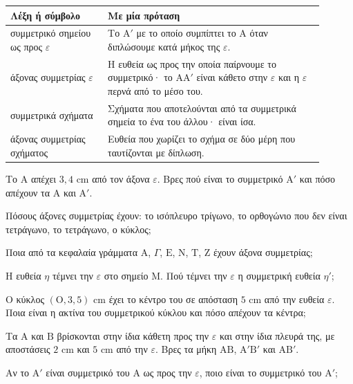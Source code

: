 

\renewcommand{\arraystretch}{1.5}
\begin{longtable}{@{}>{\raggedright\arraybackslash}p{0.28\linewidth} >{\raggedright\arraybackslash}p{0.62\linewidth}@{}}
\toprule
\textbf{Λέξη ή σύμβολο} & \textbf{Με μία πρόταση}\\
\midrule
\endhead
συμμετρικό σημείου ως προς $\varepsilon$ & Το $\mathrm{Α}'$ με το οποίο συμπίπτει το $\mathrm{Α}$ όταν διπλώσουμε κατά μήκος της $\varepsilon$.\\
άξονας συμμετρίας $\varepsilon$ & Η ευθεία ως προς την οποία παίρνουμε το συμμετρικό· το $\mathrm{ΑΑ}'$ είναι κάθετο στην $\varepsilon$ και η $\varepsilon$ περνά από το μέσο του.\\
συμμετρικά σχήματα & Σχήματα που αποτελούνται από τα συμμετρικά σημεία το ένα του άλλου· είναι ίσα.\\
άξονας συμμετρίας σχήματος & Ευθεία που χωρίζει το σχήμα σε δύο μέρη που ταυτίζονται με δίπλωση.\\
\bottomrule
\end{longtable}


\ex Το $\mathrm{Α}$ απέχει $3{,}4$ cm από τον άξονα $\varepsilon$. Βρες πού είναι το συμμετρικό $\mathrm{Α}'$ και πόσο απέχουν τα $\mathrm{Α}$ και $\mathrm{Α}'$.

\ex Πόσους άξονες συμμετρίας έχουν: το ισόπλευρο τρίγωνο, το ορθογώνιο που δεν είναι τετράγωνο, το τετράγωνο, ο κύκλος;

\ex Ποια από τα κεφαλαία γράμματα $\mathrm{Α}$, $\Gamma$, $\mathrm{Ε}$, $\mathrm{Ν}$, $\mathrm{Τ}$, $\mathrm{Ζ}$ έχουν άξονα συμμετρίας;

\ex Η ευθεία $\eta$ τέμνει την $\varepsilon$ στο σημείο $\mathrm{Μ}$. Πού τέμνει την $\varepsilon$ η συμμετρική ευθεία $\eta'$;

\ex Ο κύκλος $(\mathrm{Ο},3{,}5)$ cm έχει το κέντρο του σε απόσταση $5$ cm από την ευθεία $\varepsilon$. Ποια είναι η ακτίνα του συμμετρικού κύκλου και πόσο απέχουν τα κέντρα;

\ex Τα $\mathrm{Α}$ και $\mathrm{Β}$ βρίσκονται στην ίδια κάθετη προς την $\varepsilon$ και στην ίδια πλευρά της, με αποστάσεις $2$ cm και $5$ cm από την $\varepsilon$. Βρες τα μήκη $\mathrm{ΑΒ}$, $\mathrm{Α}'\mathrm{Β}'$ και $\mathrm{ΑΒ}'$.

\ex Αν το $\mathrm{Α}'$ είναι συμμετρικό του $\mathrm{Α}$ ως προς την $\varepsilon$, ποιο είναι το συμμετρικό του $\mathrm{Α}'$;

